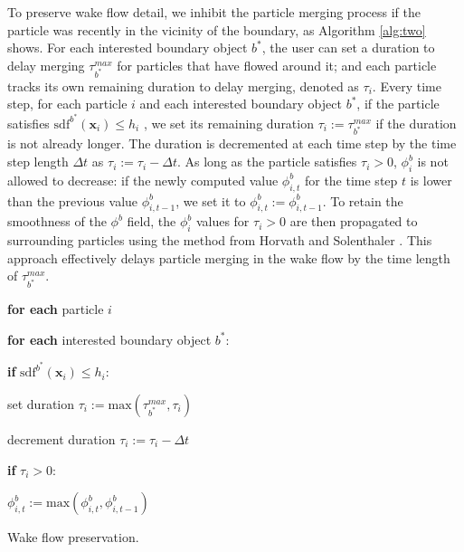 \documentclass[VANCOUVER,STIX1COL]{WileyNJD-v2}
\begin{document}
To preserve wake flow detail, we inhibit the particle merging process if the particle was recently in the vicinity of the boundary, as Algorithm \ref{alg:two} shows. For each interested boundary object $b^*$, the user can set a duration to delay merging $\tau^{max}_{b^*}$ for particles that have flowed around it; and each particle tracks its own remaining duration to delay merging, denoted as $\tau_i$. Every time step, for each particle $i$ and each interested boundary object $b^*$, if the particle satisfies $\mathrm{sdf}^{b^*}(\mathbf{x}_i)\leq h_i$ , we set its remaining duration $\tau_i := \tau^{max}_{b^*}$ if the duration is not already longer. The duration is decremented at each time step by the time step length $\Delta t$ as $\tau_i:=\tau_i-\Delta t$. As long as the particle satisfies $\tau_i > 0$, $\phi^b_i$ is not allowed to decrease: if the newly computed value $\phi^{b}_{i,t}$ for the time step $t$ is lower than the previous value $\phi^{b}_{i,t-1}$, we set it to $\phi^{b}_{i,t} := \phi^{b}_{i,t-1}$. To retain the smoothness of the $\phi^b$ field, the $\phi^b_i$ values for $\tau_i > 0$ are then propagated to surrounding particles using the method from Horvath and Solenthaler \cite{Horvath13}. This approach effectively delays particle merging in the wake flow by the time length of $\tau^{max}_{b^*}$.

\vspace{-0.5\baselineskip}

\begin{algorithm}[htb]
\par\setlength\parindent{2em}
\noindent \textbf{for each} particle $i$ 

\textbf{for each} interested boundary object $b^*$:

\hspace{2em}\textbf{if} $\mathrm{sdf}^{b^*}(\mathbf{x}_i)\leq h_i$:

\hspace{2em}\hspace{2em}set duration $\tau_i:=\mathrm{max}(\tau_{b^*}^{max},\tau_i)$
    
decrement duration $\tau_i:=\tau_i-\Delta t$
    
\textbf{if} $\tau_i>0$:
    
\hspace{2em}$\phi_{i,t}^b:=\mathrm{max}(\phi_{i,t}^b,\phi_{i,t-1}^b)$

\caption{Wake flow preservation.}
\label{alg:two}
\end{algorithm}
\end{document}
